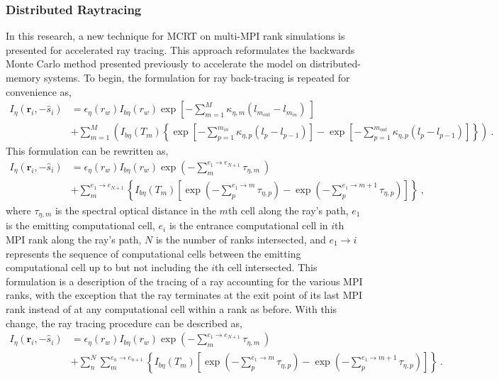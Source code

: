 \subsubsection{Distributed Raytracing}
In this research, a new technique for MCRT on multi-MPI rank simulations is presented for accelerated ray tracing. This approach reformulates the backwards Monte Carlo method presented previously to accelerate the model on distributed-memory systems.
To begin, the formulation for ray back-tracing is repeated for convenience as,
\begin{equation}
    \begin{aligned}
    I_\eta{}(\textbf{r}_i,-\hat{s}_i)& = \epsilon{}_\eta{}(r_w)I_{b\eta{}}(r_w)\exp{\left[-\sum_{m=1}^M\kappa{}_{\eta{},m}(l_{m_{out}}-l_{m_{in}})~\right]}\\
    &+\sum_{m=1}^M\left( I_{b\eta}(T_m)\left\{ \exp{\left[-\sum_{p=1}^{m_{in}}\kappa{}_{\eta{},p}(l_{p}-l_{p-1})\right]}- \exp{\left[-\sum_{p=1}^{m_{out}}\kappa{}_{\eta{},p}(l_{p}-l_{p-1})\right]} \right\} \right)~.
    \end{aligned}
\end{equation}
This formulation can be rewritten as,
\begin{equation}
    \begin{aligned}
    I_\eta{}(\textbf{r}_i,-\hat{s}_i)& = \epsilon{}_\eta{}(r_w)I_{b\eta{}}(r_w)\exp{\left(-\sum_{m}^{e_1\rightarrow{}e_{N+1}}\tau{}_{\eta{},m}~\right)}\\
    &+\sum_{m}^{e_1\rightarrow{}e_{N+1}}\left\{ I_{b\eta}(T_m)\left[ \exp{\left(-\sum_{p}^{e_1\rightarrow{}m}\tau{}_{\eta{},p}\right)}- \exp{\left(-\sum_{p}^{e_1\rightarrow{}m+1}\tau{}_{\eta{},p}\right)} \right] \right\}~,
    \end{aligned}
\end{equation}
where $\tau{}_{\eta{},m}$ is the spectral optical distance in the $m$th cell along the ray's path, $e_1$ is the emitting computational cell, $e_i$  is the entrance computational cell in $i$th MPI rank along the ray's path, $N$ is the number of ranks intersected, and $e_1\rightarrow{}i$ represents the sequence of computational cells between the emitting computational cell up to but not including the $i$th cell intersected. This formulation is a description of the tracing of a ray accounting for the various MPI ranks, with the exception that the ray terminates at the exit point of its last MPI rank instead of at any computational cell within a rank as before. With this change, the ray tracing procedure can be described as,
\begin{equation}
    \begin{aligned}
    I_\eta{}(\textbf{r}_i,-\hat{s}_i)& = \epsilon{}_\eta{}(r_w)I_{b\eta{}}(r_w)\exp{\left(-\sum_{m}^{e_1\rightarrow{}e_{N+1}}\tau{}_{\eta{},m}~\right)}\\
    &+\sum_{n}^{N}\sum_{m}^{e_n\rightarrow{}e_{n+1}}\left\{ I_{b\eta}(T_m)\left[ \exp{\left(-\sum_{p}^{e_1\rightarrow{}m}\tau{}_{\eta{},p}\right)}- \exp{\left(-\sum_{p}^{e_1\rightarrow{}m+1}\tau{}_{\eta{},p}\right)} \right] \right\}~.
    \end{aligned}
\end{equation}
